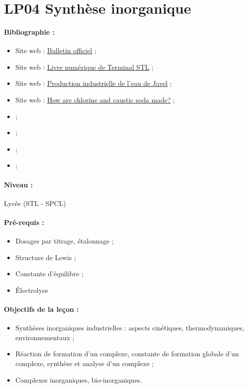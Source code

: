 \section{LP04 Synthèse inorganique}

\paragraph{Bibliographie :}
\begin{itemize}
\item Site web : \href{https://www.education.gouv.fr/pid25535/bulletin_officiel.html?cid_bo=57629}{Bulletin officiel} ;
\item Site web : \href{http://sciences-physiques-et-chimiques-de-laboratoire.org/course/view.php?id=7&section=16}{Livre numérique de Terminal STL} ;
\item Site web : \href{https://www.lelementarium.fr/product/eau-de-javel/}{Production industrielle de l'eau de Javel} ;
\item Site web : \href{https://www.eurochlor.org/about-chlor-alkali/how-are-chlorine-and-caustic-soda-made/}{How are chlorine and caustic soda made?} ;
\item \cite{Buchere2017} ;
\item \cite{Cachau-Hereillat2011} ;
\item \cite{Fosset2016} ;
\item \cite{Fosset2014} ;
\end{itemize}

\paragraph{Niveau :} Lycée (STL - SPCL)

\paragraph{Pré-requis :}
\begin{itemize}
\item Dosages par titrage, étalonnage ;
\item Structure de Lewis ;
\item Constante d'équilibre ;
\item Électrolyse
\end{itemize}

\paragraph{Objectifs de la leçon :}
\begin{itemize}
\item Synthèses inorganiques industrielles : aspects cinétiques, thermodynamiques, environnementaux ;
\item Réaction de formation d'un complexe, constante de formation globale d'un complexe, synthèse et analyse d'un complexe ;
\item Complexes inorganiques, bio-inorganiques.
\end{itemize}

